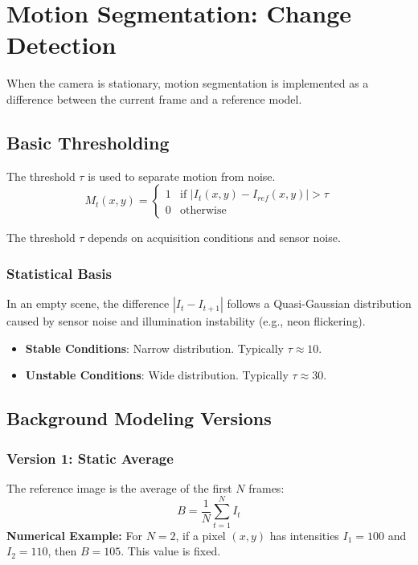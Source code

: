 \documentclass{report}
\begin{document}
\chapter{Motion Segmentation: Change Detection}
When the camera is stationary, motion segmentation is implemented as a difference between the current frame and a reference model.

\section{Basic Thresholding}
The threshold $\tau$ is used to separate motion from noise.
\begin{equation}
    M_{t}(x,y)=\begin{cases}1 & \text{if } |I_{t}(x,y)-I_{ref}(x,y)| > \tau \\ 0 & \text{otherwise}\end{cases}
\end{equation}

The threshold $\tau$ depends on acquisition conditions and sensor noise.

\subsection{Statistical Basis}
In an empty scene, the difference $|I_t - I_{t+1}|$ follows a Quasi-Gaussian distribution caused by sensor noise and illumination instability (e.g., neon flickering).
\begin{itemize}
    \item \textbf{Stable Conditions}: Narrow distribution. Typically $\tau \approx 10$.
    \item \textbf{Unstable Conditions}: Wide distribution. Typically $\tau \approx 30$.
\end{itemize}

\section{Background Modeling Versions}

\subsection{Version 1: Static Average}
The reference image is the average of the first $N$ frames:
\begin{equation}
    B = \frac{1}{N} \sum_{t=1}^{N} I_t
\end{equation}
\textbf{Numerical Example:} For $N=2$, if a pixel $(x,y)$ has intensities $I_1=100$ and $I_2=110$, then $B=105$. This value is fixed.
\end{document}

